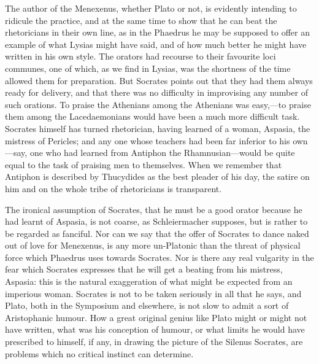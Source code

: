 \documentclass[11pt,letter]{article}
\begin{document}
\par  The author of the Menexenus, whether Plato or not, is evidently intending to ridicule the practice, and at the same time to show that he can beat the rhetoricians in their own line, as in the Phaedrus he may be supposed to offer an example of what Lysias might have said, and of how much better he might have written in his own style. The orators had recourse to their favourite loci communes, one of which, as we find in Lysias, was the shortness of the time allowed them for preparation. But Socrates points out that they had them always ready for delivery, and that there was no difficulty in improvising any number of such orations. To praise the Athenians among the Athenians was easy,—to praise them among the Lacedaemonians would have been a much more difficult task. Socrates himself has turned rhetorician, having learned of a woman, Aspasia, the mistress of Pericles; and any one whose teachers had been far inferior to his own—say, one who had learned from Antiphon the Rhamnusian—would be quite equal to the task of praising men to themselves. When we remember that Antiphon is described by Thucydides as the best pleader of his day, the satire on him and on the whole tribe of rhetoricians is transparent.

\par  The ironical assumption of Socrates, that he must be a good orator because he had learnt of Aspasia, is not coarse, as Schleiermacher supposes, but is rather to be regarded as fanciful. Nor can we say that the offer of Socrates to dance naked out of love for Menexenus, is any more un-Platonic than the threat of physical force which Phaedrus uses towards Socrates. Nor is there any real vulgarity in the fear which Socrates expresses that he will get a beating from his mistress, Aspasia: this is the natural exaggeration of what might be expected from an imperious woman. Socrates is not to be taken seriously in all that he says, and Plato, both in the Symposium and elsewhere, is not slow to admit a sort of Aristophanic humour. How a great original genius like Plato might or might not have written, what was his conception of humour, or what limits he would have prescribed to himself, if any, in drawing the picture of the Silenus Socrates, are problems which no critical instinct can determine.
\end{document}
